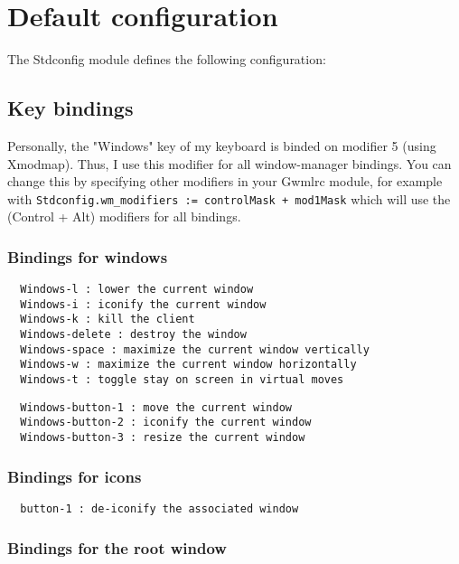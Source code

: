 \documentclass{book}
\begin{document}
\section{Default configuration}

   The Stdconfig module defines the following configuration:

\subsection{Key bindings}

    Personally, the "Windows" key of my keyboard is binded on modifier 5 (using
  Xmodmap).  Thus, I use this modifier for all window-manager bindings. 
  You can change this by specifying other modifiers in your Gwmlrc module, 
  for example with {\tt Stdconfig.wm\_modifiers := controlMask + mod1Mask} 
  which will use the (Control + Alt) modifiers for all bindings.

\subsubsection{Bindings for windows}

\begin{verbatim}
  Windows-l : lower the current window
  Windows-i : iconify the current window
  Windows-k : kill the client
  Windows-delete : destroy the window
  Windows-space : maximize the current window vertically
  Windows-w : maximize the current window horizontally
  Windows-t : toggle stay on screen in virtual moves
\end{verbatim}
  
\begin{verbatim}
  Windows-button-1 : move the current window
  Windows-button-2 : iconify the current window
  Windows-button-3 : resize the current window
\end{verbatim}
  
\subsubsection{Bindings for icons}

\begin{verbatim}
  button-1 : de-iconify the associated window
\end{verbatim}

\subsubsection{Bindings for the root window}
\end{document}

